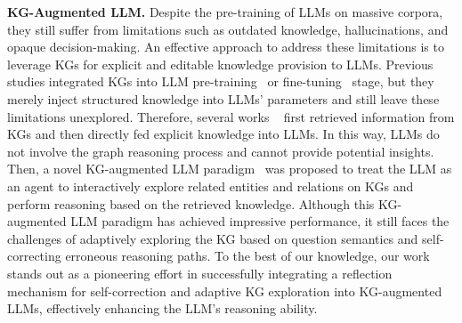 \documentclass{article}
\begin{document}
\noindent \textbf{KG-Augmented LLM.}
Despite the pre-training of LLMs on massive corpora, they still suffer from limitations such as outdated knowledge, hallucinations, and opaque decision-making.
An effective approach to address these limitations is to leverage KGs for explicit and editable knowledge provision to LLMs.
Previous studies integrated KGs into LLM pre-training~\cite{zhang2019ernie, wang2021kepler} or fine-tuning~\cite{yao2019kg, luo2024reasoning} stage, but they merely inject structured knowledge into LLMs' parameters and still leave these limitations unexplored. 
Therefore, several works ~\cite{baek2023knowledge, axelsson2023using,wang2023boosting} first retrieved information from KGs and then directly fed explicit knowledge into LLMs. In this way, LLMs do not involve the graph reasoning process and cannot provide potential insights.
Then, a novel KG-augmented LLM paradigm~\cite{jiang2023structgpt,sun2024think} was proposed to treat the LLM as an agent to interactively explore related entities and relations on KGs and perform reasoning based on the retrieved knowledge.
Although this KG-augmented LLM paradigm has achieved impressive performance, it still faces the challenges of adaptively exploring the KG based on question semantics and self-correcting erroneous reasoning paths.
To the best of our knowledge, our work stands out as a pioneering effort in successfully integrating a reflection mechanism for self-correction and adaptive KG exploration into KG-augmented LLMs, effectively enhancing the LLM's reasoning ability.
\end{document}
